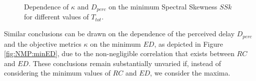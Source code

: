 \begin{figure}[!tb]
\begin{flushright}
    \hfil
\end{flushright}
\caption{Dependence of $\kappa$ and $D_{perc}$ on the minimum Spectral Skewness $SSk$ for different values of $T_{tot}$.}
\label{fig:NMP:minSSk}
\end{figure}

Similar conclusions can be drawn on the dependence of the perceived delay $D_{perc}$ and the objective metrics $\kappa$ on the minimum $ED$, as depicted in Figure \ref{fig:NMP:minED}, due to the non-negligible correlation that exists between $RC$ and $ED$. 
These conclusions remain substantially unvaried if, instead of considering the minimum values of $RC$ and $ED$, we consider the maxima.


